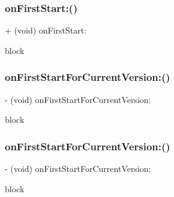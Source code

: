 \subsubsection{\texorpdfstring{on\+First\+Start\+:()}{onFirstStart:()}\hspace{0.1cm}{\footnotesize\ttfamily [3/3]}}
{\footnotesize\ttfamily + (void) on\+First\+Start\+: \begin{DoxyParamCaption}\item[{(void($^\wedge$)(B\+O\+OL \hyperlink{interface_m_a_r_global_manager_ab871ef83135ce7e7f412fdebfae76c0d}{is\+First\+Start}))}]{block }\end{DoxyParamCaption}}

\mbox{\label{interface_m_a_r_global_manager_a9fbd733535e678723c05fe81aa99891a}} 
\subsubsection{\texorpdfstring{on\+First\+Start\+For\+Current\+Version\+:()}{onFirstStartForCurrentVersion:()}\hspace{0.1cm}{\footnotesize\ttfamily [1/3]}}
{\footnotesize\ttfamily -\/ (void) on\+First\+Start\+For\+Current\+Version\+: \begin{DoxyParamCaption}\item[{(void($^\wedge$)(B\+O\+OL))}]{block }\end{DoxyParamCaption}\hspace{0.3cm}{\ttfamily [implementation]}}

\mbox{\label{interface_m_a_r_global_manager_a0fa3b3aaa9b424536891ca366c9fc2a9}} 
\subsubsection{\texorpdfstring{on\+First\+Start\+For\+Current\+Version\+:()}{onFirstStartForCurrentVersion:()}\hspace{0.1cm}{\footnotesize\ttfamily [2/3]}}
{\footnotesize\ttfamily -\/ (void) on\+First\+Start\+For\+Current\+Version\+: \begin{DoxyParamCaption}\item[{(void($^\wedge$)(B\+O\+OL \hyperlink{interface_m_a_r_global_manager_ab111e5c33b73bd47237c0006b532655b}{is\+First\+Start\+For\+Current\+Version}))}]{block }\end{DoxyParamCaption}}


